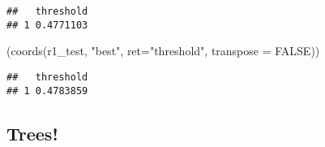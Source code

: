 \documentclass[
]{article}
\newenvironment{Shaded}{\begin{snugshade}}{\end{snugshade}}
\newcommand{\AttributeTok}[1]{\textcolor[rgb]{0.77,0.63,0.00}{#1}}
\newcommand{\ConstantTok}[1]{\textcolor[rgb]{0.00,0.00,0.00}{#1}}
\newcommand{\FunctionTok}[1]{\textcolor[rgb]{0.00,0.00,0.00}{#1}}
\newcommand{\NormalTok}[1]{#1}
\newcommand{\StringTok}[1]{\textcolor[rgb]{0.31,0.60,0.02}{#1}}
\begin{document}
\begin{verbatim}
##   threshold
## 1 0.4771103
\end{verbatim}

\begin{Shaded}
\begin{Highlighting}[]
\NormalTok{(}\FunctionTok{coords}\NormalTok{(r1\_test, }\StringTok{"best"}\NormalTok{, }\AttributeTok{ret=}\StringTok{"threshold"}\NormalTok{, }\AttributeTok{transpose =} \ConstantTok{FALSE}\NormalTok{))}
\end{Highlighting}
\end{Shaded}

\begin{verbatim}
##   threshold
## 1 0.4783859
\end{verbatim}

\hypertarget{trees}{%
\subsection{Trees!}\label{trees}}
\end{document}
